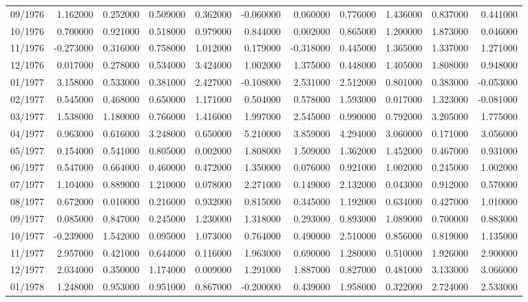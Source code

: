 \begin{tabular}{lrrrrrrrrrr}
09/1976 & 1.162000 & 0.252000 & 0.509000 & 0.362000 & -0.060000 & 0.060000 & 0.776000 & 1.436000 & 0.837000 & 0.441000 \\
10/1976 & 0.700000 & 0.921000 & 0.518000 & 0.979000 & 0.844000 & 0.002000 & 0.865000 & 1.200000 & 1.873000 & 0.046000 \\
11/1976 & -0.273000 & 0.316000 & 0.758000 & 1.012000 & 0.179000 & -0.318000 & 0.445000 & 1.365000 & 1.337000 & 1.271000 \\
12/1976 & 0.017000 & 0.278000 & 0.534000 & 3.424000 & 1.002000 & 1.375000 & 0.448000 & 1.405000 & 1.808000 & 0.948000 \\
01/1977 & 3.158000 & 0.533000 & 0.381000 & 2.427000 & -0.108000 & 2.531000 & 2.512000 & 0.801000 & 0.383000 & -0.053000 \\
02/1977 & 0.545000 & 0.468000 & 0.650000 & 1.171000 & 0.504000 & 0.578000 & 1.593000 & 0.017000 & 1.323000 & -0.081000 \\
03/1977 & 1.538000 & 1.180000 & 0.766000 & 1.416000 & 1.997000 & 2.545000 & 0.990000 & 0.792000 & 3.205000 & 1.775000 \\
04/1977 & 0.963000 & 0.616000 & 3.248000 & 0.650000 & 5.210000 & 3.859000 & 4.294000 & 3.060000 & 0.171000 & 3.056000 \\
05/1977 & 0.154000 & 0.541000 & 0.805000 & 0.002000 & 1.808000 & 1.509000 & 1.362000 & 1.452000 & 0.467000 & 0.931000 \\
06/1977 & 0.547000 & 0.664000 & 0.460000 & 0.472000 & 1.350000 & 0.076000 & 0.921000 & 1.002000 & 0.245000 & 1.002000 \\
07/1977 & 1.104000 & 0.889000 & 1.210000 & 0.078000 & 2.271000 & 0.149000 & 2.132000 & 0.043000 & 0.912000 & 0.570000 \\
08/1977 & 0.672000 & 0.010000 & 0.216000 & 0.932000 & 0.815000 & 0.345000 & 1.192000 & 0.634000 & 0.427000 & 1.010000 \\
09/1977 & 0.085000 & 0.847000 & 0.245000 & 1.230000 & 1.318000 & 0.293000 & 0.893000 & 1.089000 & 0.700000 & 0.883000 \\
10/1977 & -0.239000 & 1.542000 & 0.095000 & 1.073000 & 0.764000 & 0.490000 & 2.510000 & 0.856000 & 0.819000 & 1.135000 \\
11/1977 & 2.957000 & 0.421000 & 0.644000 & 0.116000 & 1.963000 & 0.690000 & 1.280000 & 0.510000 & 1.926000 & 2.900000 \\
12/1977 & 2.034000 & 0.350000 & 1.174000 & 0.009000 & 1.291000 & 1.887000 & 0.827000 & 0.481000 & 3.133000 & 3.066000 \\
01/1978 & 1.248000 & 0.953000 & 0.951000 & 0.867000 & -0.200000 & 0.439000 & 1.958000 & 0.322000 & 2.724000 & 2.533000 \\

\end{tabular}
